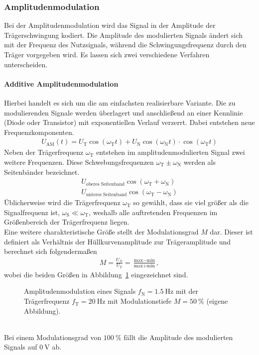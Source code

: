 \documentclass[a4paper,twoside,final]{article}
\begin{document}
\subsubsection{Amplitudenmodulation}
Bei der Amplitudenmodulation wird das Signal in der Amplitude der Trägerschwingung kodiert. Die Amplitude des modulierten Signals ändert sich mit der Frequenz des Nutzsignals, während die Schwingungsfrequenz durch den Träger vorgegeben wird. Es lassen sich zwei verschiedene Verfahren unterscheiden.
\paragraph{Additive Amplitudenmodulation}
Hierbei handelt es sich um die am einfachsten realisierbare Variante. Die zu modulierenden Signale werden überlagert und anschließend an einer Kennlinie (Diode oder Transistor) mit exponentiellen Verlauf verzerrt. Dabei entstehen neue Frequenzkomponenten.
\begin{align}
  U_\text{AM}(t) = U_\text{T}\cos(\omega_\text{T}t) + U_\text{N}\cos(\omega_\text{N}t)\cdot\cos(\omega_\text{T}t)\label{eqn:AM_additiv}
\end{align}
Neben der Trägerfrequenz $\omega_\text{T}$ entstehen im amplitudenmodulierten Signal zwei weitere Frequenzen. Diese Schwebungsfrequenzen $\omega_\text{T} \pm \omega_\text{N}$ werden als Seitenbänder bezeichnet.
\begin{align}
  U_\text{oberes Seitenband}\cos(\omega_\text{T} + \omega_\text{N})\\
  U_\text{unteres Seitenband}\cos(\omega_\text{T} - \omega_\text{N})
\end{align}
Üblicherweise wird die Trägerfrequenz $\omega_\text{T}$ so gewählt, dass sie viel größer als die Signalfrequenz ist, $\omega_\text{S} \ll \omega_\text{T}$, weshalb alle auftretenden Frequenzen im Größenbereich der Trägerfrequenz liegen.\\
Eine weitere charakteristische Größe stellt der Modulationsgrad $M$ dar. Dieser ist definiert als Verhältnis der Hüllkurvenamplitude zur Trägeramplitude und berechnet sich folgendermaßen
\begin{align}
  M = \frac{U_N}{U_T} = \frac{\text{max}-\text{min}}{\text{max}+\text{min}},\label{eqn:Modulationsgrad}
\end{align}
wobei die beiden Größen in Abbildung~\ref{fig:Amplitudenmodulation} eingezeichnet sind.
\begin{figure}[htp]
    \centering
        
    \caption{Amplitudenmodulation eines Signals $f_\text{N} = \SI{1.5}{\hertz}$ mit der Trägerfrequenz $f_\text{T} = \SI{20}{\hertz}$ mit Modulationstiefe $M = \SI{50}{\percent}$ (eigene Abbildung).}
    \label{fig:Amplitudenmodulation}
\end{figure}\\
Bei einem Modulationsgrad von $\SI{100}{\percent}$ fällt die Amplitude des modulierten Signals auf $\SI{0}{\volt}$ ab.
\end{document}
